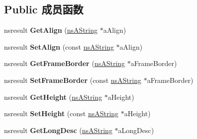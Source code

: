 \subsection*{Public 成员函数}
\begin{DoxyCompactItemize}
\item 
\mbox{\label{interfacens_i_d_o_m_h_t_m_l_i_frame_element_a40622ae149b9ebaa8c646cf9ceac1547}} 
nsresult {\bfseries Get\+Align} (\hyperlink{structns_string_container}{ns\+A\+String} $\ast$a\+Align)
\item 
\mbox{\label{interfacens_i_d_o_m_h_t_m_l_i_frame_element_a6ef2a96a3afe2ce9a942295b42148c10}} 
nsresult {\bfseries Set\+Align} (const \hyperlink{structns_string_container}{ns\+A\+String} $\ast$a\+Align)
\item 
\mbox{\label{interfacens_i_d_o_m_h_t_m_l_i_frame_element_aae17fc31eb527500b01e0cfba40b081a}} 
nsresult {\bfseries Get\+Frame\+Border} (\hyperlink{structns_string_container}{ns\+A\+String} $\ast$a\+Frame\+Border)
\item 
\mbox{\label{interfacens_i_d_o_m_h_t_m_l_i_frame_element_a7254d123b34cbea3c6121815d50e3816}} 
nsresult {\bfseries Set\+Frame\+Border} (const \hyperlink{structns_string_container}{ns\+A\+String} $\ast$a\+Frame\+Border)
\item 
\mbox{\label{interfacens_i_d_o_m_h_t_m_l_i_frame_element_a505718491f254b916547f28cdef2b916}} 
nsresult {\bfseries Get\+Height} (\hyperlink{structns_string_container}{ns\+A\+String} $\ast$a\+Height)
\item 
\mbox{\label{interfacens_i_d_o_m_h_t_m_l_i_frame_element_a4d537637172191480df8b88769fa2968}} 
nsresult {\bfseries Set\+Height} (const \hyperlink{structns_string_container}{ns\+A\+String} $\ast$a\+Height)
\item 
\mbox{\label{interfacens_i_d_o_m_h_t_m_l_i_frame_element_a2f544ef974e66c4dc9b7e2c30faa0ab3}} 
nsresult {\bfseries Get\+Long\+Desc} (\hyperlink{structns_string_container}{ns\+A\+String} $\ast$a\+Long\+Desc)

\end{DoxyCompactItemize}
